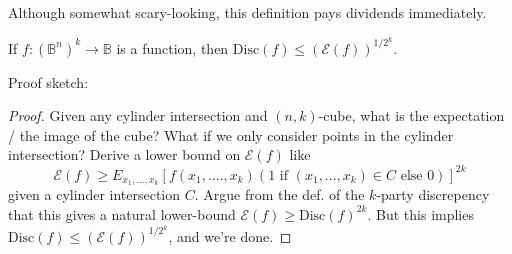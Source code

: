 Although somewhat scary-looking, this definition pays dividends immediately.
\begin{lemma}
If $f : (\mathbb{B}^n)^k \to \mathbb{B}$ is a function,
then $\text{Disc}(f) \leq (\mathcal{E}(f))^{1/2^k}$.
\end{lemma}
\pause
Proof sketch:
\begin{proof}
{\tiny Given any cylinder intersection and $(n, k)$-cube, what is the expectation / the image of the cube?  What if we only consider points in the cylinder intersection? Derive a lower bound on $\mathcal{E}(f)$ like}
\[{\scriptstyle \mathcal{E}(f) \geq E_{x_1,...,x_k}[f(x_1,....,x_k)(1 \text{ if } (x_1,...,x_k) \in C \text{ else } 0)]^{2k}}\]
{\tiny given a cylinder intersection $C$. Argue from the def. of the $k$-party discrepency that this gives a natural lower-bound $\mathcal{E}(f) \geq \text{Disc}(f)^{2k}$. But this implies \(\text{Disc}(f) \leq (\mathcal{E}(f))^{1/2^k}\), and we're done.}
\end{proof}